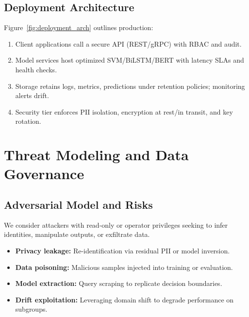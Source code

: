 \documentclass[conference]{IEEEtran}
\begin{document}
\subsection{Deployment Architecture}
Figure~\ref{fig:deployment_arch} outlines production:
\begin{enumerate}
  \item Client applications call a secure API (REST/gRPC) with RBAC and audit.
  \item Model services host optimized SVM/BiLSTM/BERT with latency SLAs and health checks.
  \item Storage retains logs, metrics, predictions under retention policies; monitoring alerts drift.
  \item Security tier enforces PII isolation, encryption at rest/in transit, and key rotation.
\end{enumerate}

\section{Threat Modeling and Data Governance}

\subsection{Adversarial Model and Risks}
We consider attackers with read-only or operator privileges seeking to infer identities, manipulate outputs, or exfiltrate data.
\begin{itemize}
  \item \textbf{Privacy leakage:} Re-identification via residual PII or model inversion.
  \item \textbf{Data poisoning:} Malicious samples injected into training or evaluation.
  \item \textbf{Model extraction:} Query scraping to replicate decision boundaries.
  \item \textbf{Drift exploitation:} Leveraging domain shift to degrade performance on subgroups.
\end{itemize}
\end{document}
